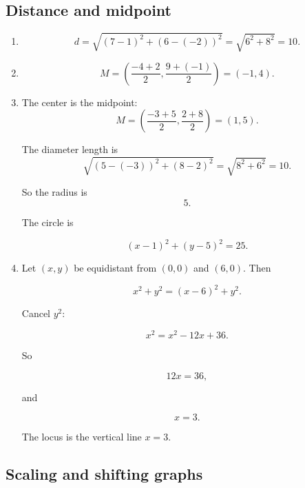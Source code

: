 \subsection*{Distance and midpoint}

\begin{enumerate}
\item
\[
d=\sqrt{(7-1)^2+(6-(-2))^2}
=
\sqrt{6^2+8^2}
=
10.
\]

\item
\[
M=
\left(
\frac{-4+2}{2},
\frac{9+(-1)}{2}
\right)
=
(-1,4).
\]

\item
The center is the midpoint:
\[
M=
\left(
\frac{-3+5}{2},
\frac{2+8}{2}
\right)
=
(1,5).
\]

The diameter length is
\[
\sqrt{(5-(-3))^2+(8-2)^2}
=
\sqrt{8^2+6^2}
=
10.
\]

So the radius is
\[
5.
\]

The circle is

\[
\boxed{
(x-1)^2+(y-5)^2=25.
}
\]

\item
Let \((x,y)\) be equidistant from \((0,0)\) and \((6,0)\).  Then

\[
x^2+y^2=(x-6)^2+y^2.
\]

Cancel \(y^2\):

\[
x^2=x^2-12x+36.
\]

So

\[
12x=36,
\]

and

\[
\boxed{x=3.}
\]

The locus is the vertical line \(x=3\).
\end{enumerate}

\subsection*{Scaling and shifting graphs}


